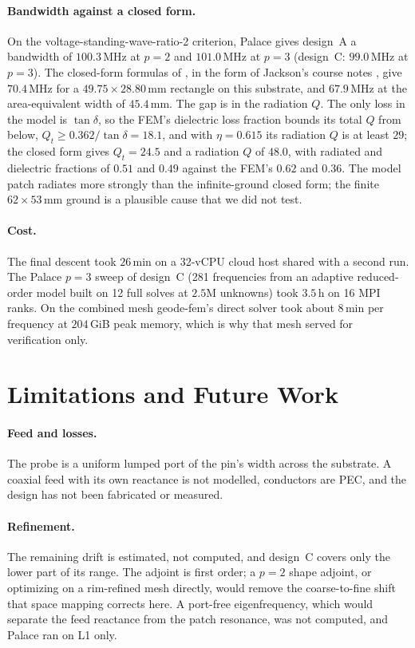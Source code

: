 \documentclass{anvil-paper}
\begin{document}
\paragraph{Bandwidth against a closed form.}
On the voltage-standing-wave-ratio-2 criterion, Palace gives design~A a
bandwidth of $100.3$\,MHz at $p = 2$ and $101.0$\,MHz at $p = 3$ (design~C:
$99.0$\,MHz at $p = 3$). The closed-form formulas of
\citet{jackson1991simple}, in the form of Jackson's course notes
\citep{jackson_ece6345}, give $70.4$\,MHz for a $49.75\times28.80$\,mm
rectangle on this substrate, and $67.9$\,MHz at the area-equivalent width of
$45.4$\,mm. The gap is in the radiation $Q$. The only loss in the model is
$\tan\delta$, so the FEM's dielectric loss fraction bounds its total $Q$
from below, $Q_t \ge 0.362/\tan\delta = 18.1$, and with $\eta = 0.615$ its
radiation $Q$ is at least $29$; the closed form gives $Q_t = 24.5$ and a
radiation $Q$ of $48.0$, with radiated and dielectric fractions of
$0.51$ and $0.49$ against the FEM's $0.62$ and $0.36$. The model patch
radiates more strongly than the infinite-ground closed form; the finite
$62\times53$\,mm ground is a plausible cause that we did not test.

\paragraph{Cost.}
The final descent took $26$\,min on a 32-vCPU cloud host shared with a
second run. The Palace $p = 3$ sweep of design~C (281 frequencies from an
adaptive reduced-order model built on 12 full solves at $2.5$M unknowns) took
$3.5$\,h on 16 MPI ranks. On the combined mesh geode-fem's direct solver
took about $8$\,min per frequency at $204$\,GiB peak memory, which is why
that mesh served for verification only.

\section{Limitations and Future Work}
\label{sec:limits}

\paragraph{Feed and losses.}
The probe is a uniform lumped port of the pin's width across the substrate.
A coaxial feed with its own reactance is not modelled, conductors are PEC,
and the design has not been fabricated or measured.

\paragraph{Refinement.}
The remaining drift is estimated, not computed, and design~C covers only
the lower part of its range. The adjoint is first order; a $p = 2$ shape
adjoint, or optimizing on a rim-refined mesh directly, would remove the
coarse-to-fine shift that space mapping corrects here. A port-free
eigenfrequency, which would separate the feed reactance from the patch
resonance, was not computed, and Palace ran on L1 only.
\end{document}
